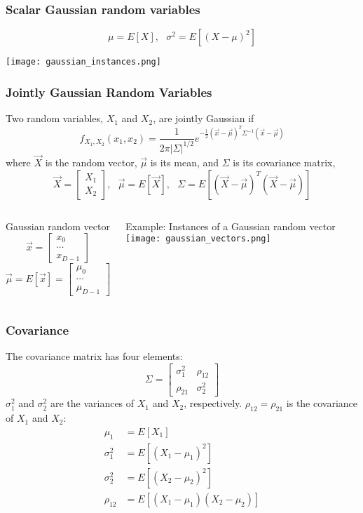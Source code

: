 \documentclass{beamer}
\begin{document}
\begin{frame}
  \frametitle{Scalar Gaussian random variables}
  \[
  \mu=E[X],~~~\sigma^2=E[(X-\mu)^2]
  \]
  \centerline{\texttt{[image: gaussian\_instances.png]}}
\end{frame}

\begin{frame}
  \frametitle{Jointly Gaussian Random Variables}

  Two random variables, $X_1$ and $X_2$, are jointly Gaussian if
  \[
  f_{X_1,X_2}(x_1,x_2) = \frac{1}{2\pi|\Sigma|^{1/2}}
  e^{-\frac{1}{2}(\vec{x}-\vec\mu)^T\Sigma^{-1}(\vec{x}-\vec\mu)}
  \]
  where $\vec{X}$ is the random vector, $\vec\mu$ is its mean, and $\Sigma$ is its
  covariance matrix,
  \[
  \vec{X}=\left[\begin{array}{c}X_1\\X_2\end{array}\right],~~~
  \vec\mu=E\left[\vec{X}\right],~~~
  \Sigma = E\left[(\vec{X}-\vec\mu)^T(\vec{X}-\vec\mu)\right]
  \]
\end{frame}

\begin{frame}
  \begin{columns}
    \column{2.125in}
    \begin{block}{Gaussian random vector}
      \[
      \vec{x}=\left[\begin{array}{c}x_0\\\cdots\\x_{D-1}\end{array}\right]
      \]
      \[
      \vec\mu=E[\vec{x}]=\left[\begin{array}{c}\mu_0\\\cdots\\\mu_{D-1}\end{array}\right]
      \]
    \end{block}
    \column{2.125in}
    \begin{block}{Example: Instances of a Gaussian random vector}
      \texttt{[image: gaussian\_vectors.png]}
    \end{block}
  \end{columns}
\end{frame}

\begin{frame}
  \frametitle{Covariance}
  The covariance matrix has four elements:
  \[
  \Sigma = \left[\begin{array}{cc}\sigma_1^2 & \rho_{12} \\\rho_{21} & \sigma_2^2\end{array}\right]
  \]
  $\sigma_1^2$ and $\sigma_2^2$ are the variances of $X_1$ and $X_2$, respectively.
  $\rho_{12}=\rho_{21}$ is the covariance of $X_1$ and $X_2$:
  \begin{align*}
    \mu_1 & = E[X_1]\\
    \sigma_1^2 &= E\left[(X_1-\mu_1)^2\right]\\
    \sigma_2^2 &= E\left[(X_2-\mu_2)^2\right]\\
    \rho_{12} &= E\left[(X_1-\mu_1)(X_2-\mu_2)\right]
  \end{align*}
\end{frame}
\end{document}
